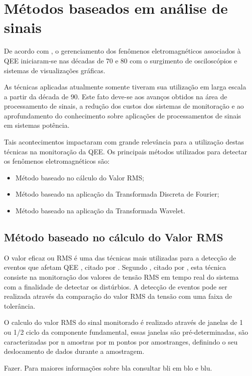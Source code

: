 \section{Métodos baseados em análise de sinais}
\par
De acordo com \cite{JUN09}, o gerenciamento dos fenômenos eletromagnéticos associados à QEE iniciaram-se nas décadas de 70 e 80 com o surgimento de osciloscópios e sistemas de visualizações gráficas.
\par
As técnicas aplicadas atualmente somente tiveram sua utilização em larga escala a partir da década de 90. Este fato deve-se aos avanços obtidos na área de processamento de sinais, a redução dos custos dos sistemas de monitoração e ao aprofundamento do conhecimento sobre aplicações de processamentos de sinais em sistemas potência.
\par
Tais acontecimentos impactaram com grande relevância para a utilização destas técnicas na monitoração da QEE. Os principais métodos utilizados para detectar os fenômenos eletromagnéticos são:
\begin{itemize}
\item Método baseado no cálculo do Valor RMS; 
\item Método baseado na aplicação da Transformada Discreta de Fourier;
\item Método baseado na aplicação da Transformada Wavelet.
\end{itemize}
\subsection{Método baseado no cálculo do Valor RMS}
\par
O valor eficaz ou RMS é uma das técnicas mais utilizadas para a detecção de eventos que afetam QEE %
, citado por \cite{BAC11}. Segundo \cite{THE99}, citado por \cite{JUN09}, esta técnica consiste na monitoração dos valores de tensão RMS em tempo real do sistema com a finalidade de detectar os distúrbios. A detecção de eventos pode ser realizada através da comparação do valor RMS da tensão com uma faixa de tolerância. 
\par 
O calculo do valor RMS do sinal monitorado é realizado através de janelas de 1 ou 1/2 ciclo da componente fundamental, essas janelas são pré-determinadas, são caracterizadas por n amostras por m pontos por amostranges, definindo o seu deslocamento de dados durante a amostragem. 
\par \color{red}
Fazer. Para maiores informações sobre bla consultar bli em blo e blu.
\color{black}
